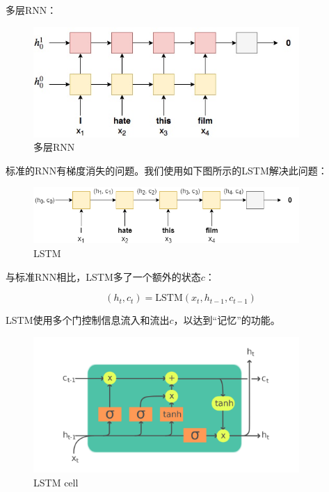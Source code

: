 \documentclass[a4paper]{article}
\begin{document}
多层RNN：

\begin{figure}[H]
    \centering
    \includegraphics[width=0.9\textwidth]{assets/mul-rnn.jpg}
    \caption{多层RNN}
\end{figure}

标准的RNN有梯度消失的问题。我们使用如下图所示的LSTM解决此问题：

\begin{figure}[H]
    \centering
    \includegraphics[width=0.9\textwidth]{assets/lstm.png}
    \caption{LSTM}
\end{figure}

与标准RNN相比，LSTM多了一个额外的状态$c$：

\begin{equation}
    (h_t,c_t)=\textrm{LSTM}(x_t,h_{t-1},c_{t-1})
\end{equation}

LSTM使用多个门控制信息流入和流出$c$，以达到“记忆”的功能。

\begin{figure}[H]
    \centering
    \includegraphics[width=0.9\textwidth]{assets/lstm-cell.png}
    \caption{LSTM cell}
\end{figure}
\end{document}
